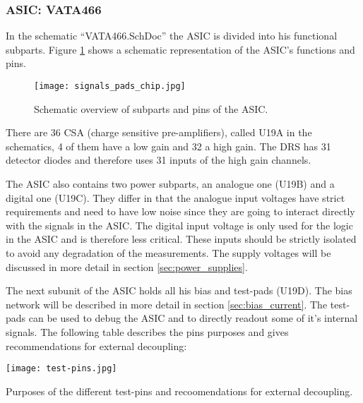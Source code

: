 \subsubsection{ASIC: VATA466}
\label{sec:asic}
In the schematic ``VATA466.SchDoc'' the ASIC is divided into his functional subparts.
Figure \ref{fig:signals_pads} shows a schematic representation of the ASIC's functions and pins.
\begin{figure}[H]
    \centering
    \texttt{[image: signals\_pads\_chip.jpg]}
    \caption[Signals and Chip Pad Frame]{Schematic overview of subparts and pins of the ASIC.\cite[p. 14, fig. 3]{Meier2016VATA466}}
    \label{fig:signals_pads}
\end{figure}

There are 36 CSA (charge sensitive pre-amplifiers), called U19A in the schematics, 4 of them have a low gain and 32 a high gain.
The DRS has 31 detector diodes and therefore uses 31 inputs of the high gain channels.

The ASIC also contains two power subparts, an analogue one (U19B) and a digital one (U19C).
They differ in that the analogue input voltages have strict requirements and need to have low noise since they are going to interact directly with the signals in the ASIC.
The digital input voltage is only used for the logic in the ASIC and is therefore less critical.
These inputs should be strictly isolated to avoid any degradation of the measurements.
The supply voltages will be discussed in more detail in section \ref{sec:power_supplies}.

The next subunit of the ASIC holds all his bias and test-pads (U19D).
The bias network will be described in more detail in section \ref{sec:bias_current}.
The test-pads can be used to debug the ASIC and to directly readout some of it's internal signals.
The following table describes the pins purposes and gives recommendations for external decoupling:
\begin{table}[h!]
	\centering
    \texttt{[image: test-pins.jpg]}
    \caption[Test-pins Purpose and External Decoupling]{Purposes of the different test-pins and recoomendations for external decoupling.\cite[p. 65, tab. 31]{Meier2016VATA466}}
	\label{tab:test-pads}
\end{table}

